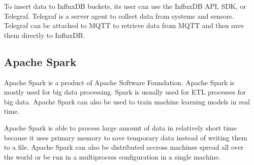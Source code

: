 To insert data to InfluxDB buckets, its user can use the InfluxDB API, SDK, or
Telegraf. Telegraf is a server agent to collect data from systems and sensors.
Telegraf can be attached to MQTT to retrieve data from MQTT and then save them
directly to InfluxDB.

\subsection{Apache Spark}

Apache Spark is a product of Apache Software Foundation. Apache Spark is mostly
used for big data processing. Spark is usually used for ETL processes for big
data. Apache Spark can also be used to train machine learning models in real
time.

Apache Spark is able to process large amount of data in relatively short time
because it uses primary memory to save temporary data instead of writing them to
a file. Apache Spark can also be distributed accross machines spread all over
the world or be run in a multiprocess configuration in a single machine.